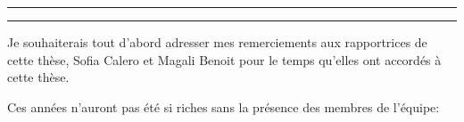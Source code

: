 \begin{otherlanguage}{english}

\hrule\relax
\vspace*{.9\baselineskip}%
\raggedright{\huge{}}\par%
\vspace*{1.1\baselineskip}%
\hrule\relax
\vspace*{\baselineskip}%
\thispagestyle{empty}

\begingroup
\itshape

Je souhaiterais tout d'abord adresser mes remerciements aux rapportrices de cette thèse, Sofia Calero et Magali Benoit pour le temps qu'elles ont accordés à cette thèse. 




Ces années n'auront pas été si riches sans la présence des membres de l'équipe:





\endgroup

\clearpage
\mbox{}
\thispagestyle{empty}
\clearpage

%
%
%
%
%
%
%

\end{otherlanguage}
    